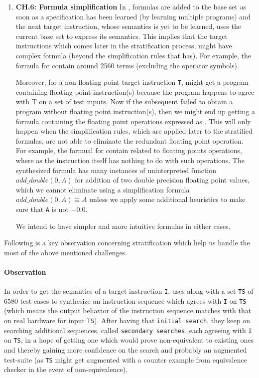 \begin{enumerate}
    \item \textbf{CH.6: Formula simplification} In \Strata{}, formulas are added to the base set as soon as a specification has been learned (by learning multiple programs) and  the next target instruction, whose semantics is yet to be learned, uses the current base set to express its semantics. This implies that the target instructions  which comes later in the stratification process, might have complex formula (beyond the simplification rules that \Strata has). For example, the \Strata formula
    for  contain around 2560 terms (excluding the operator symbols). 
    
    Moreover, for a non-floating point target instruction {\tt T}, \Strata might get a program containing floating point instruction(s) because the program happens to agree with T on a set of test inputs. Now if the subsequent \secS{} failed to obtain a  program without floating point instruction(s), then we might end up getting a formula containing the floating point operations expressed as \uif{}. This will only happen when the simplification rules, which are applied later to the stratified formulas,  are not able to eliminate the redundant floating point operation. For example, the \Strata formual for  contain \uif{} related to floating points operations, where as the instruction itself has nothing to do with such operations. The synthesized formula has many instances of uninterpreted function $add\_double(0, A)$ for addition of two double precision floating point values, which we cannot eliminate using a simplification formula $add\_double(0, A) \equiv A$ unless we apply some additional heuristics to make sure that {\tt A} is not $-0.0$.
    
    We intend to have simpler and more intuitive formulas in either cases.
    

\end{enumerate} 

Following is a key observation concerning stratification which help us handle
the most of the above mentioned challenges.

\paragraph{Observation} In order to get the semantics of a target instruction
{\tt I}, \Strata uses \Stoke along with a set {\tt TS} of $6580$ test cases to
synthesize an instruction sequence which agrees with {\tt I} on {\tt TS} (which
    means the output behavior of the instruction sequence matches with that on
    real hardware for input {\tt TS}). After having that {\tt initial search},
           they keep on searching  additional sequences, called {\tt secondary
             searches}, each agreeing with {\tt I} on {\tt TS}, in a hope of
             getting  one which would prove non-equivalent to existing ones and
             thereby gaining more confidence on the search and probably an
             augmented test-suite (as {\tt TS} might get augmented with a
                 counter example from equivalence checker in the event of
                 non-equivalence). 
      
